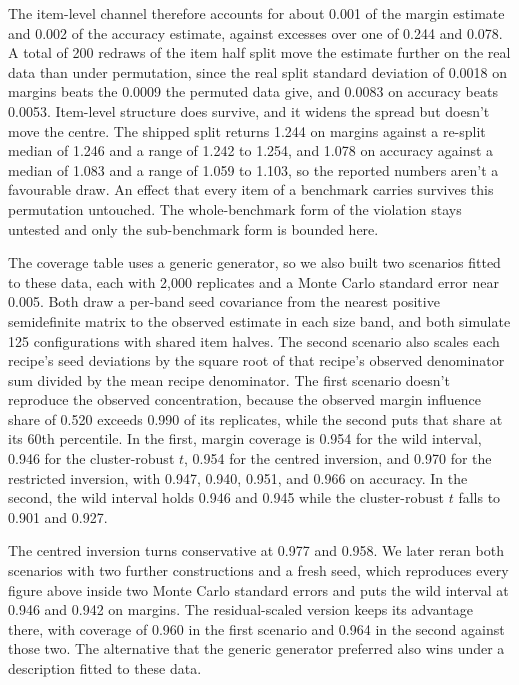 The item-level channel therefore accounts for about 0.001 of the margin estimate and 0.002 of the accuracy estimate, against excesses over one of 0.244 and 0.078. A total of 200 redraws of the item half split move the estimate further on the real data than under permutation, since the real split standard deviation of 0.0018 on margins beats the 0.0009 the permuted data give, and 0.0083 on accuracy beats 0.0053. Item-level structure does survive, and it widens the spread but doesn't move the centre. The shipped split returns 1.244 on margins against a re-split median of 1.246 and a range of 1.242 to 1.254, and 1.078 on accuracy against a median of 1.083 and a range of 1.059 to 1.103, so the reported numbers aren't a favourable draw. An effect that every item of a benchmark carries survives this permutation untouched. The whole-benchmark form of the violation stays untested and only the sub-benchmark form is bounded here.

The coverage table uses a generic generator, so we also built two scenarios fitted to these data, each with 2,000 replicates and a Monte Carlo standard error near 0.005. Both draw a per-band seed covariance from the nearest positive semidefinite matrix to the observed estimate in each size band, and both simulate 125 configurations with shared item halves. The second scenario also scales each recipe's seed deviations by the square root of that recipe's observed denominator sum divided by the mean recipe denominator. The first scenario doesn't reproduce the observed concentration, because the observed margin influence share of 0.520 exceeds 0.990 of its replicates, while the second puts that share at its 60th percentile. In the first, margin coverage is 0.954 for the wild interval, 0.946 for the cluster-robust $t$, 0.954 for the centred inversion, and 0.970 for the restricted inversion, with 0.947, 0.940, 0.951, and 0.966 on accuracy. In the second, the wild interval holds 0.946 and 0.945 while the cluster-robust $t$ falls to 0.901 and 0.927.

The centred inversion turns conservative at 0.977 and 0.958. We later reran both scenarios with two further constructions and a fresh seed, which reproduces every figure above inside two Monte Carlo standard errors and puts the wild interval at 0.946 and 0.942 on margins. The residual-scaled version keeps its advantage there, with coverage of 0.960 in the first scenario and 0.964 in the second against those two. The alternative that the generic generator preferred also wins under a description fitted to these data.


